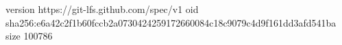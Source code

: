 version https://git-lfs.github.com/spec/v1
oid sha256:e6a42c2f1b60fccb2a0730424259172660084c18c9079c4d9f161dd3afd541ba
size 100786
